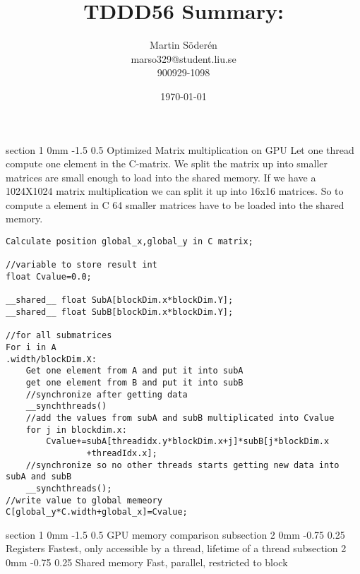 \documentclass[a4paper,11pt]{article}
\makeatletter
\renewcommand{\section}{\@startsection
   {section}%
   {1}%
   {0mm}%
   {-1.5\baselineskip}%
   {0.5\baselineskip}%
   {\sffamily\bfseries\upshape\normalsize}}%
\renewcommand{\subsection}{\@startsection
   {subsection}%
   {2}%
   {0mm}%
   {-0.75\baselineskip}%
   {0.25\baselineskip}%
   {\rmfamily\normalfont\slshape\normalsize}}%
\makeatother
\begin{document}
\begin{titlepage}
\title{TDDD56 Summary:}
\author{Martin Söderén\\ marso329@student.liu.se\\900929-1098}
\date{\today}
\maketitle
\vfill %
\thispagestyle{empty}
\end{titlepage}
\section{Optimized Matrix multiplication on GPU}
Let one thread compute one element in the C-matrix. We split the matrix up into smaller matrices are small enough to load into the shared memory. If we have a 1024X1024 matrix multiplication we can split it up into 16x16 matrices. So to compute a element in C 64 smaller matrices have to be loaded into the shared memory.
\begin{lstlisting}
Calculate position global_x,global_y in C matrix;

//variable to store result int
float Cvalue=0.0;

__shared__ float SubA[blockDim.x*blockDim.Y];
__shared__ float SubB[blockDim.x*blockDim.Y];

//for all submatrices
For i in A
.width/blockDim.X:
	Get one element from A and put it into subA
	get one element from B and put it into subB
	//synchronize after getting data
	__synchthreads()
	//add the values from subA and subB multiplicated into Cvalue
	for j in blockdim.x:
		Cvalue+=subA[threadidx.y*blockDim.x+j]*subB[j*blockDim.x
				+threadIdx.x];
	//synchronize so no other threads starts getting new data into subA and subB
	__synchthreads();
//write value to global memeory
C[global_y*C.width+global_x]=Cvalue;

\end{lstlisting}
\section{GPU memory comparison}
\subsection{Registers}
Fastest, only accessible by a thread, lifetime of a thread
\subsection{Shared memory}
Fast, parallel, restricted to block
\end{document}
